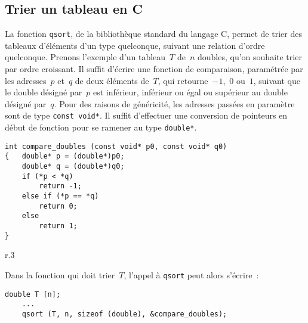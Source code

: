 \documentclass[11pt]{article}
\newcounter{points_counter}
\newcounter{section_points_counter}
\begin{document}
\subsection{Trier un tableau en C}

La fonction \texttt{qsort}, de la bibliothèque standard du langage C,
permet de trier des tableaux d'éléments d'un type quelconque, suivant
une relation d'ordre quelconque. Prenons l'exemple d'un tableau~$T$ de~$n$
doubles, qu'on souhaite trier par ordre croissant. Il suffit d'écrire 
une fonction de comparaison, paramétrée par les adresses~$p$ et~$q$ 
de deux éléments de~$T$, qui retourne~$-1$,~$0$ ou~$1$, suivant que 
le double désigné par~$p$ est inférieur, inférieur ou égal ou supérieur au
double désigné par~$q$. Pour des raisons de généricité, les adresses
passées en paramètre sont de type \texttt{const void*}. Il suffit
d'effectuer une conversion de pointeurs en début de fonction pour
se ramener au type \texttt{double*}.

\begin{Verbatim}[fontsize=\small]
int compare_doubles (const void* p0, const void* q0)
{   double* p = (double*)p0;
    double* q = (double*)q0;
    if (*p < *q)
        return -1;
    else if (*p == *q)
        return 0;
    else
        return 1;
}
\end{Verbatim}

\begin{wrapfigure}{r}{.3\linewidth}
\end{wrapfigure}

Dans la fonction qui doit trier~$T$, l'appel à \texttt{qsort} peut alors
s'écrire~:
\begin{Verbatim}[fontsize=\small]
    double T [n];
    ...
    qsort (T, n, sizeof (double), &compare_doubles);
\end{Verbatim}
\end{document}
